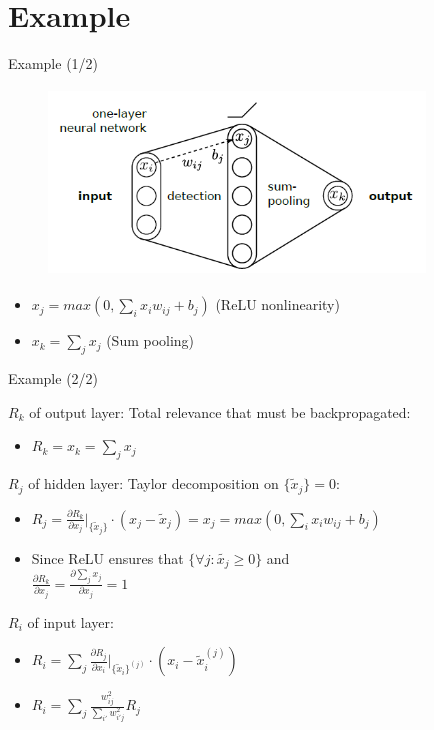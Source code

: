 \documentclass{beamer}
\begin{document}
\section{Example}
\begin{frame}{Example (1/2)}

\begin{figure}[ht]
	\centering
    \includegraphics[width=10cm, height=5cm]{figures/one_layer_network}
	\label{fig:OneLayerNetwork}
\end{figure}

\begin{itemize}
\item $x_j = max(0, \sum_i x_i w_{ij} + b_j)$ (ReLU nonlinearity)
\item $x_k = \sum_j x_j$ (Sum pooling)
\end{itemize}

\end{frame}

\begin{frame}{Example (2/2)}

$R_k$ of output layer: Total relevance that must be backpropagated:
\begin{itemize}
\item $R_k = x_k = \sum_j x_j$ 
\end{itemize}

$R_j$ of hidden layer: Taylor decomposition on $\{ \tilde{x}_j \} = 0$:
\begin{itemize}
\item $R_j = \frac{\partial R_k}{\partial x_j} \biggr\rvert_{\{ \tilde{x}_j \}} \cdot (x_j - \tilde{x}_j) = x_j = max(0, \sum_i x_i w_{ij} + b_j)$ \\
\item Since ReLU ensures that $\{ \forall j: \tilde{x_j} \geq 0 \}$ and \\ 
$\frac{\partial R_k}{\partial x_j} = \frac{\partial \sum_j x_j}{\partial x_j} = 1$
\end{itemize}

$R_i$ of input layer: 
\begin{itemize}
\item $R_i = \sum_j \frac{\partial R_j}{\partial x_i} \biggr\rvert_{\{ \tilde{x}_i \}^{(j)}} \cdot (x_i - \tilde{x}_i^{(j)})$
\item $R_i = \sum_j \frac{w_{ij}^2}{\sum_{i'} w_{i'j}^2} R_j$ 
\end{itemize}

\end{frame}
\end{document}
